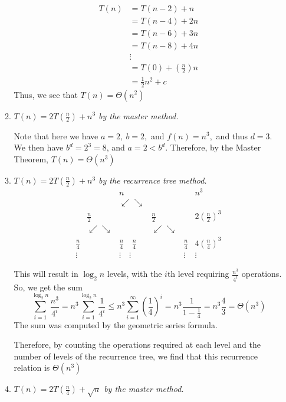 \documentclass[12pt]{article}
\begin{document}
\begin{enumerate}
\begin{enumerate}
    \begin{align*}
    T(n) &= T(n-2) + n\\
    &= T(n-4) + 2n\\
    &= T(n-6) + 3n\\
    &= T(n-8) + 4n\\
    &\vdots \\
    &= T(0) + (\frac{n}{2})n\\
    &= \frac{1}{2}n^2 + c
    \end{align*}
    Thus, we see that $\boxed{T(n) = \Theta(n^2)}$
	
    \item \textit{$T(n) = 2T(\frac{n}{2}) + n^3$ by the master method.}
    
    Note that here we have $a = 2,\ b = 2,$ and $f(n) = n^3,$ and thus $d = 3$. We then have $b^d = 2^3 = 8$, and $a = 2 < b^d$. Therefore, by the Master Theorem, $\boxed{T(n) = \Theta(n^3)}$ 
    
    \item \textit{$T(n) = 2T(\frac{n}{2}) + n^3$ by the recurrence tree method.}
    \[
    \begin{array}{ccccc|c}
    &&n&&&n^3\\
    &&\swarrow\searrow&&&\\
    &\frac{n}{2}&&\frac{n}{2}&&2\left(\frac{n}{2}\right)^3\\
    &\swarrow\searrow&&\swarrow\searrow&\\
    \frac{n}{4}&&\frac{n}{4}\hspace{12pt}\frac{n}{4}&&\frac{n}{4}&4\left(\frac{n}{4}\right)^3\\
    \vdots && \vdots\hspace{12pt}\vdots && \vdots & \vdots
    \end{array}
    \]
    
    This will result in $\log_2 n$ levels, with the $i$th level requiring $\frac{n^3}{4^i}$ operations. So, we get the sum
    \[
    \sum_{i=1}^{\log_2 n} \frac{n^3}{4^i} = n^3 \sum_{i=1}^{\log_2 n} \frac{1}{4^i} \leq n^3 \sum_{i=1}^{\infty} \left(\frac{1}{4}\right)^i = n^3\frac{1}{1-\frac{1}{4}} = n^3 \frac{4}{3} = \Theta(n^3)
    \]
    The sum was computed by the geometric series formula.
    
    Therefore, by counting the operations required at each level and the number of levels of the recurrence tree, we find that this recurrence relation is $\boxed{\Theta(n^3)}$
    
    \item \textit{$T(n) = 2T(\frac{n}{4}) + \sqrt{n}$ by the master method.}
    

\end{enumerate}
\end{enumerate}
\end{document}
